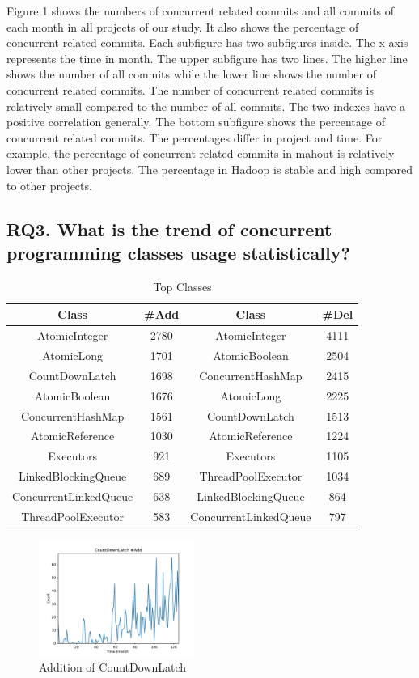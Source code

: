 Figure 1 shows the numbers of concurrent related commits and all commits of each month in all projects of our study. It also shows the percentage of concurrent related commits. Each subfigure has two subfigures inside. The x axis represents the time in month. The upper subfigure has two lines. The higher line shows the number of all commits while the lower line shows the number of concurrent related commits. The number of concurrent related commits is relatively small compared to the number of all commits. The two indexes have a positive correlation generally. The bottom subfigure shows the percentage of concurrent related commits. The percentages differ in project and time. For example, the percentage of concurrent related commits in mahout is relatively lower than other projects. The percentage in Hadoop is stable and high compared to other projects.

\subsection{RQ3. What is the trend of concurrent programming classes usage statistically?}

\begin{table}
	\centering
	\caption{Top Classes}
	\begin{tabular}{|c|c||c|c|}\hline
		Class&\#Add&Class&\#Del\\\hline
		AtomicInteger&2780&AtomicInteger&4111\\\hline
		AtomicLong&1701&AtomicBoolean&2504\\\hline
		CountDownLatch&1698&ConcurrentHashMap&2415\\\hline
		AtomicBoolean&1676&AtomicLong&2225\\\hline
		ConcurrentHashMap&1561&CountDownLatch&1513\\\hline
		AtomicReference&1030&AtomicReference&1224\\\hline
		Executors&921&Executors&1105\\\hline
		LinkedBlockingQueue&689&ThreadPoolExecutor&1034\\\hline
		ConcurrentLinkedQueue&638&LinkedBlockingQueue&864\\\hline
		ThreadPoolExecutor&583&ConcurrentLinkedQueue&797\\\hline
	\end{tabular}
\end{table}

\begin{figure}
	\centering
	\includegraphics[height=1.5in]{CountDownLatchAdd}
	\caption{Addition of CountDownLatch}
\end{figure}

